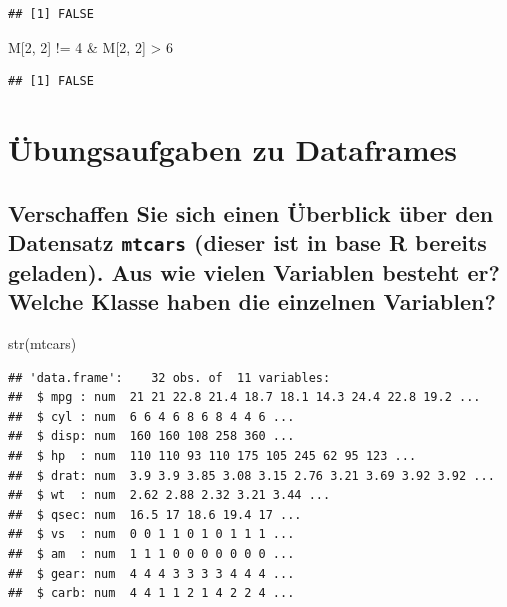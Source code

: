 \documentclass[12pt,a4paper]{article}
\newenvironment{Shaded}{\begin{snugshade}}{\end{snugshade}}
\newcommand{\DecValTok}[1]{\textcolor[rgb]{0.00,0.00,0.81}{#1}}
\newcommand{\FunctionTok}[1]{\textcolor[rgb]{0.00,0.00,0.00}{#1}}
\newcommand{\NormalTok}[1]{#1}
\newcommand{\SpecialCharTok}[1]{\textcolor[rgb]{0.00,0.00,0.00}{#1}}
\begin{document}
\begin{verbatim}
## [1] FALSE
\end{verbatim}

\begin{Shaded}
\begin{Highlighting}[]
\NormalTok{    M[}\DecValTok{2}\NormalTok{, }\DecValTok{2}\NormalTok{] }\SpecialCharTok{!=} \DecValTok{4} \SpecialCharTok{\&}\NormalTok{ M[}\DecValTok{2}\NormalTok{, }\DecValTok{2}\NormalTok{] }\SpecialCharTok{\textgreater{}} \DecValTok{6}
\end{Highlighting}
\end{Shaded}

\begin{verbatim}
## [1] FALSE
\end{verbatim}

\hypertarget{uxfcbungsaufgaben-zu-dataframes}{%
\section{Übungsaufgaben zu
Dataframes}\label{uxfcbungsaufgaben-zu-dataframes}}

\hypertarget{verschaffen-sie-sich-einen-uxfcberblick-uxfcber-den-datensatz-mtcars-dieser-ist-in-base-r-bereits-geladen.-aus-wie-vielen-variablen-besteht-er-welche-klasse-haben-die-einzelnen-variablen}{%
\subsection{\texorpdfstring{Verschaffen Sie sich einen Überblick über
den Datensatz \texttt{mtcars} (dieser ist in base R bereits geladen).
Aus wie vielen Variablen besteht er? Welche Klasse haben die einzelnen
Variablen?}{Verschaffen Sie sich einen Überblick über den Datensatz mtcars (dieser ist in base R bereits geladen). Aus wie vielen Variablen besteht er? Welche Klasse haben die einzelnen Variablen?}}\label{verschaffen-sie-sich-einen-uxfcberblick-uxfcber-den-datensatz-mtcars-dieser-ist-in-base-r-bereits-geladen.-aus-wie-vielen-variablen-besteht-er-welche-klasse-haben-die-einzelnen-variablen}}

\begin{Shaded}
\begin{Highlighting}[]
    \FunctionTok{str}\NormalTok{(mtcars)}
\end{Highlighting}
\end{Shaded}

\begin{verbatim}
## 'data.frame':    32 obs. of  11 variables:
##  $ mpg : num  21 21 22.8 21.4 18.7 18.1 14.3 24.4 22.8 19.2 ...
##  $ cyl : num  6 6 4 6 8 6 8 4 4 6 ...
##  $ disp: num  160 160 108 258 360 ...
##  $ hp  : num  110 110 93 110 175 105 245 62 95 123 ...
##  $ drat: num  3.9 3.9 3.85 3.08 3.15 2.76 3.21 3.69 3.92 3.92 ...
##  $ wt  : num  2.62 2.88 2.32 3.21 3.44 ...
##  $ qsec: num  16.5 17 18.6 19.4 17 ...
##  $ vs  : num  0 0 1 1 0 1 0 1 1 1 ...
##  $ am  : num  1 1 1 0 0 0 0 0 0 0 ...
##  $ gear: num  4 4 4 3 3 3 3 4 4 4 ...
##  $ carb: num  4 4 1 1 2 1 4 2 2 4 ...
\end{verbatim}
\end{document}
